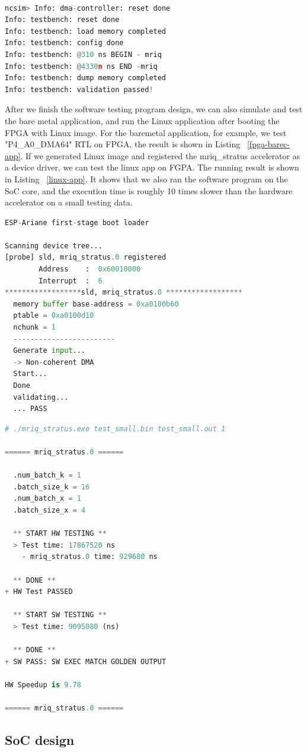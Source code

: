 \begin{lstlisting}[language=Python, caption=RTL simulation of P4\_A1\_DMA64
  ,label={sim-rtl}]

ncsim> Info: dma-controller: reset done
Info: testbench: reset done
Info: testbench: load memory completed
Info: testbench: config done
Info: testbench: @310 ns BEGIN - mriq
Info: testbench: @4330n ns END -mriq
Info: testbench: dump memory completed
Info: testbench: validation passed!

\end{lstlisting}


After we finish the software testing program design, we can also simulate and
test the bare metal application, and run the Linux application after booting the
FPGA with Linux image. For the baremetal application, for example, we test
"P4\_A0\_DMA64" RTL on FPGA, the result is shown in Listing ~\ref{fpga-barec-app}. If
we generated Linux image and registered the mriq\_stratus accelerator as a
device driver, we can test the linux app on FGPA. The running result is shown in
Listing ~\ref{linux-app}. It shows that we also ran the
software program on the SoC core, and the execution time is roughly 10 times
slower than the hardware accelerator on a small testing data.

\begin{lstlisting}[language=Python, caption=Running baremetal app on FPGA, 
    label=fpga-barec-app]
ESP-Ariane first-stage boot loader

Scanning device tree...
[probe] sld, mriq_stratus.0 registered
        Address    :  0x60010000    
        Interrupt  :  6
******************sld, mriq_stratus.0 ******************
  memory buffer base-address = 0xa0100b60
  ptable = 0xa0100d10
  nchunk = 1
  ------------------------
  Generate input...
  -> Non-coherent DMA
  Start...
  Done
  validating...
  ... PASS
\end{lstlisting}


\begin{lstlisting}[language=Python, caption=Running Linux app on FPGA, 
    label={linux-app}]
# ./mriq_stratus.exe test_small.bin test_small.out 1

====== mriq_stratus.0 ======

  .num_batch_k = 1
  .batch_size_k = 16
  .num_batch_x = 1
  .batch_size_x = 4
  
  ** START HW TESTING **
  > Test time: 17867520 ns
    - mriq_stratus.0 time: 929680 ns
    
  ** DONE **
+ HW Test PASSED

  ** START SW TESTING **
  > Test time: 9095080 (ns)
  
  ** DONE **
+ SW PASS: SW EXEC MATCH GOLDEN OUTPUT

HW Speedup is 9.78

====== mriq_stratus.0 ======
\end{lstlisting}


\subsection{SoC design}
